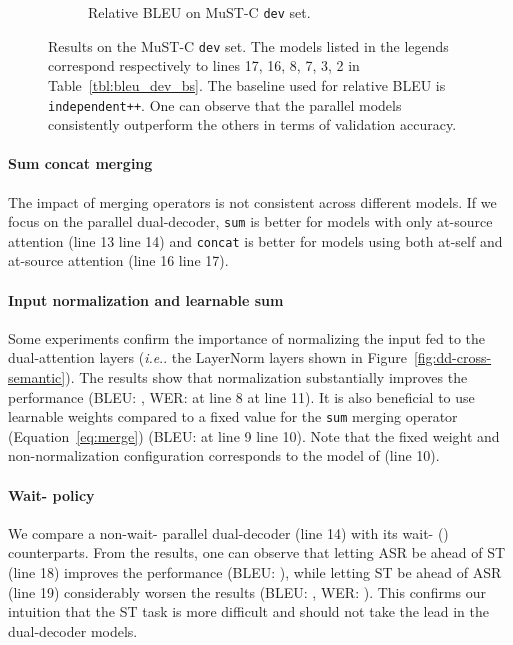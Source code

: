 \documentclass[11pt]{article}
\makeatletter
\DeclareRobustCommand\onedot{\futurelet\@let@token\@onedot}
\def\@onedot{\ifx\@let@token.\else.\null\fi\xspace}
\def\ie{\emph{i.e}\onedot} \def\Ie{\emph{I.e}\onedot}
\theoremstyle{plain}
\theoremstyle{definition}
\newcommand{\var}[1]{\texttt{#1}}
\makeatother
\begin{document}
\begin{figure}[!tb]
\begin{subfigure}[b]{.5\textwidth}
{\begin{tikzpicture}
\end{tikzpicture}
 }
  \caption{Relative BLEU on MuST-C \var{dev} set.}
  \label{fig:bleu-dev}
\end{subfigure}
\caption{Results on the MuST-C \var{dev} set. The models listed in the legends correspond respectively to lines 17, 16, 8, 7, 3, 2 in Table~\ref{tbl:bleu_dev_bs}. The baseline used for relative BLEU is \var{independent++}. One can observe that the parallel models consistently outperform the others in terms of validation accuracy.
}
\label{fig:dd-vs-independent}
\end{figure}

\paragraph{Sum \vs concat merging}
The impact of merging operators is not consistent across different models. 
If we focus on the parallel dual-decoder, \var{sum} is better for models with only at-source attention (line 13 \vs line 14) and \var{concat} is better for models using both at-self and at-source attention (line 16 \vs line 17). 

\paragraph{Input normalization and learnable sum} 
Some experiments confirm the importance of normalizing the input fed to the dual-attention layers (\ie the LayerNorm layers shown in Figure~\ref{fig:dd-cross-semantic}).
The results show that normalization {substantially} improves the performance (BLEU:  \vs , WER:  \vs  at line 8 \vs at line 11). It is also beneficial to use learnable weights compared to a fixed value for the \var{sum} merging operator (Equation~\eqref{eq:merge}) (BLEU:  \vs  at line 9 \vs line 10). Note that the fixed weight and non-normalization configuration corresponds to the model of  (line 10).

\paragraph{Wait- policy} We compare a non-wait- parallel dual-decoder (line 14) with its wait- () counterparts. From the results, one can observe that letting ASR be ahead of ST (line 18) improves the performance ({BLEU: } ), while letting ST be ahead of ASR (line 19) {considerably} worsen the results ({BLEU: }{, WER: }). This confirms our intuition that the ST task is more difficult and should not take the lead in the dual-decoder models. 
\end{document}
